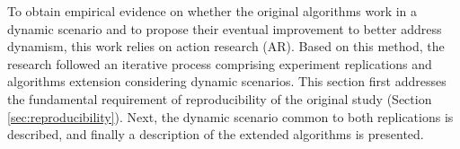 
To obtain empirical evidence on whether the original algorithms work in a dynamic scenario and to propose their eventual improvement to better address dynamism, this work relies on action research (AR)\cite{action_research}. Based on this method, the research followed an iterative process comprising experiment replications and algorithms extension considering dynamic scenarios. This section first addresses the fundamental requirement of reproducibility of the original study (Section \ref{sec:reproducibility}). Next, the dynamic scenario common to both replications is described, and finally a description of the  extended algorithms is presented. 
